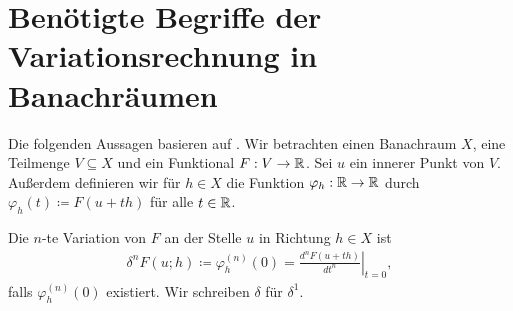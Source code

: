 % 
% 
% 
% 

\section{Benötigte Begriffe der Variationsrechnung in Banachräumen}

Die folgenden Aussagen basieren auf \cite[S. 189-192]{Zei85}.
Wir betrachten einen Banachraum $X$, eine Teilmenge $V\subseteq X$ und ein
Funktional $F:V\to\mathbb{R}$. Sei $u$ ein innerer Punkt von $V$. Außerdem
definieren wir für $h\in X$ die Funktion $\varphi_h:\mathbb{R}\to\mathbb{R}$ durch 
$\varphi_h(t)\coloneqq F(u+th)$ für alle $t\in\mathbb{R}$.

\begin{definition}[$n$-te Variation]
  Die $n$-te Variation von $F$ an der Stelle $u$ in Richtung $h\in X$ ist 
  \begin{align*}
    \delta^n F(u;h)\coloneqq \varphi_h^{(n)}(0)=
    \left. \frac{d^n F(u+th)}{dt^n}\right|_{t=0},
  \end{align*}
  falls $\varphi_h^{(n)}(0)$ existiert. Wir schreiben $\delta$ für $\delta^1$.
\end{definition}

